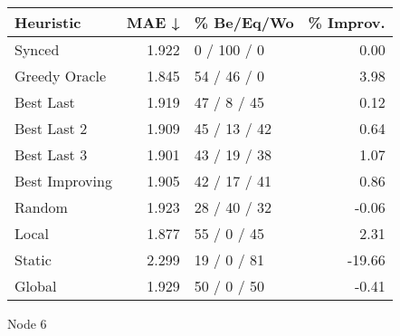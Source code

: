 \begin{tabular}{lrlr}
\toprule
\textbf{Heuristic} & \textbf{MAE ↓} & \textbf{\% Be/Eq/Wo} & \textbf{\% Improv.} \\
\midrule
            Synced &          1.922 &          0 / 100 / 0 &                0.00 \\
     Greedy Oracle &          1.845 &          54 / 46 / 0 &                3.98 \\
         Best Last &          1.919 &          47 / 8 / 45 &                0.12 \\
       Best Last 2 &          1.909 &         45 / 13 / 42 &                0.64 \\
       Best Last 3 &          1.901 &         43 / 19 / 38 &                1.07 \\
    Best Improving &          1.905 &         42 / 17 / 41 &                0.86 \\
            Random &          1.923 &         28 / 40 / 32 &               -0.06 \\
             Local &          1.877 &          55 / 0 / 45 &                2.31 \\
            Static &          2.299 &          19 / 0 / 81 &              -19.66 \\
            Global &          1.929 &          50 / 0 / 50 &               -0.41 \\
\bottomrule
\end{tabular}
\caption{Node 6}
\label{tab:ds_non_lr05_le1_bs2_6}
